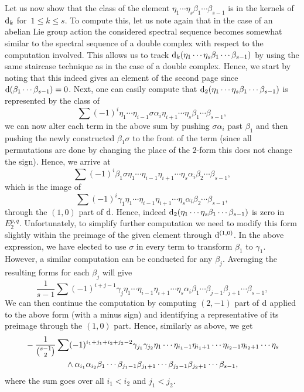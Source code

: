 \documentclass[pdftex]{sigma}
\numberwithin{equation}{section}
\theoremstyle{definition}
\begin{document}
Let us now show that the class of the element $\eta_1\cdots \eta_s\beta_1\cdots \beta_{s-1}$ is in the kernels of ${\rm d}_{k}$ for~${1\leq k\leq s}$. To compute this, let us note again that in the case of an abelian Lie group action the considered spectral sequence becomes somewhat similar to the spectral sequence of a double complex with respect to the computation involved. This allows us to track ${\rm d}_k(\eta_1\cdots \eta_s\beta_1\cdots \beta_{s-1})$ by using the same staircase technique as in the case of a double complex. Hence, we start by noting that this indeed gives an element of the second page since ${\rm d}(\beta_1\cdots \beta_{s-1})=0$. Next, one can easily compute that ${\rm d}_2(\eta_1\cdots \eta_s\beta_1\cdots \beta_{s-1})$ is represented by the class of
\[\sum (-1)^i\eta_1\cdots \eta_{i-1}\sigma\alpha_i\eta_{i+1}\cdots \eta_s\beta_1\cdots \beta_{s-1},\]
we can now alter each term in the above sum by pushing $\sigma\alpha_i$ past $\beta_1$ and then pushing the newly constructed $\beta_1\sigma$ to the front of the term (since all permutations are done by changing the place of the $2$-form this does not change the sign). Hence, we arrive at
\[\sum (-1)^i\beta_1\sigma\eta_1\cdots \eta_{i-1}\eta_{i+1}\cdots \eta_s\alpha_i\beta_2\cdots \beta_{s-1},\]
which is the image of
\[\sum (-1)^i\gamma_1\eta_1\cdots \eta_{i-1}\eta_{i+1}\cdots \eta_s\alpha_i\beta_2\cdots \beta_{s-1},\]
through the $(1,0)$ part of ${\rm d}$. Hence, indeed ${\rm d}_2(\eta_1\cdots \eta_s\beta_1\cdots \beta_{s-1})$ is zero in $E^{p,q}_2$. Unfortunately, to simplify further computation we need to modify this form slightly within the preimage of the given element through ${\rm d}^{(1,0)}$. In the above expression, we have elected to use $\sigma$ in every term to transform $\beta_1$ to $\gamma_1$. However, a similar computation can be conducted for any $\beta_j$. Averaging the resulting forms for each $\beta_j$ will give
\[\frac{1}{s-1}\sum (-1)^{i+j-1}\gamma_j\eta_1\cdots \eta_{i-1}\eta_{i+1}\cdots \eta_s\alpha_i\beta_1\cdots \beta_{j-1}\beta_{j+1}\cdots \beta_{s-1},\]
We can then continue the computation by computing $(2,-1)$ part of ${\rm d}$ applied to the above form (with a minus sign) and identifying a representative of its preimage through the $(1,0)$ part. Hence, similarly as above, we get{\samepage
\begin{gather*}
\begin{split}
& -\frac{1}{{s-1\choose 2}}\sum (-1)^{i_1+j_1+i_2+j_2-2}\gamma_{j_1}\gamma_{j_2}\eta_1\cdots \eta_{i_1-1}\eta_{i_1+1}\cdots \eta_{i_2-1}\eta_{i_2+1}\cdots\eta_s\\
& \hphantom{-\frac{1}{{s-1\choose 2}}\sum }{}\wedge
\alpha_{i_1}\alpha_{i_2}\beta_1\cdots \beta_{j_1-1}\beta_{j_1+1}\cdots \beta_{j_2-1}\beta_{j_2+1}\cdots \beta_{s-1},
\end{split}
\end{gather*}
where the sum goes over all $i_1<i_2$ and $j_1<j_2$.}
\end{document}
